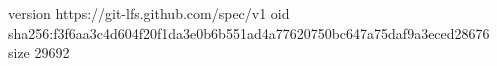 version https://git-lfs.github.com/spec/v1
oid sha256:f3f6aa3c4d604f20f1da3e0b6b551ad4a77620750bc647a75daf9a3eced28676
size 29692
